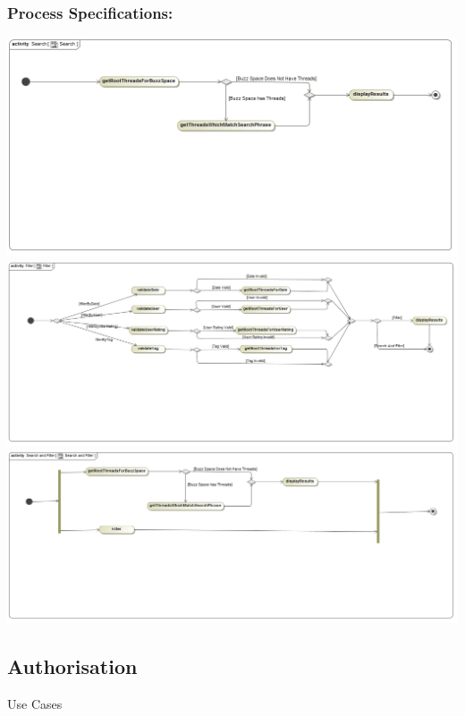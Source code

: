 \documentclass[a4paper,11pt]{article}
\begin{document}
\subsubsection{Process Specifications:} 
\includegraphics[width=1\linewidth]{Images/SearchAndFilter/Search_processSpecification}\\
\includegraphics[width=1\linewidth]{Images/SearchAndFilter/Filter_processSpecification}\\
\includegraphics[width=1\linewidth]{Images/SearchAndFilter/SearchAndFilter_processSpecification}\\

\newpage
\begin{center}
\section{\textbf{\huge{Authorisation}}}

\Large{Use Cases}
\end{center}
\end{document}
